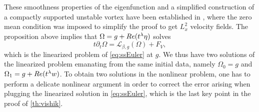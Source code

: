 \documentclass[11pt,reqno]{amsproc}
\def\de{{\partial}}
\def\Re{{\rm Re}}
\theoremstyle{definition}
\theoremstyle{definition}
\numberwithin{equation}{section}
\begin{document}
These smoothness properties of the eigenfunction and a simplified construction of a compactly supported unstable vortex have been established in \cite{castro2024proof}, where the zero mean condition was imposed to simplify the proof to get $L^2_x$ velocity fields.
The proposition above implies that $\Omega=g+\Re(t^\lambda \eta)$ solves
\begin{equation}
    t\de_t \Omega=\mathcal{L}_{\beta,g}(\Omega)+F_V,
\end{equation}
which is the linearized problem of \cref{eq:ssEuler} at $g$. We thus have two solutions of the linearized problem emanating from the same initial data, namely $\Omega_0=g$ and $\Omega_1=g+\Re(t^\lambda w)$. To obtain two solutions in the nonlinear problem, one has to perform a delicate nonlinear argument in order to  correct the error arising when plugging the linearized solution in \cref{eq:ssEuler}, which is the last key point in the proof of \cref{th:vishik}. 
\end{document}
